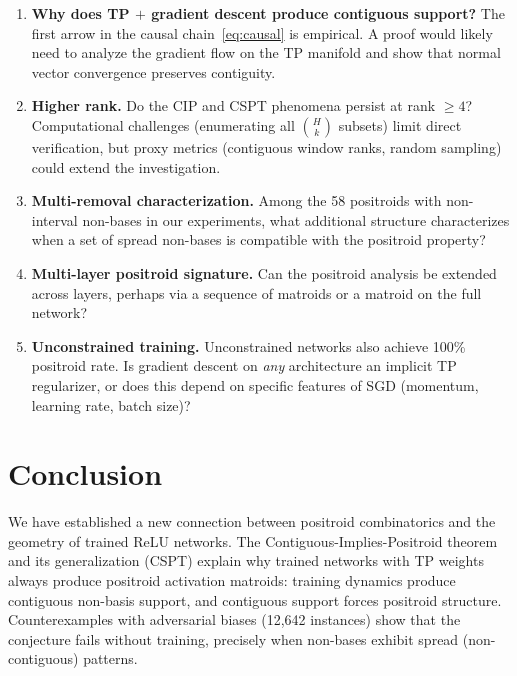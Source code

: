 \documentclass[11pt]{article}
\theoremstyle{definition}
\theoremstyle{remark}
\begin{document}
\begin{enumerate}
  \item \textbf{Why does TP $+$ gradient descent produce contiguous
    support?}  The first arrow in the causal chain~\eqref{eq:causal}
    is empirical.  A proof would likely need to analyze the gradient
    flow on the TP manifold and show that normal vector convergence
    preserves contiguity.

  \item \textbf{Higher rank.}  Do the CIP and CSPT phenomena persist
    at rank $\geq 4$?  Computational challenges (enumerating all
    $\binom{H}{k}$ subsets) limit direct verification, but proxy
    metrics (contiguous window ranks, random sampling) could extend
    the investigation.

  \item \textbf{Multi-removal characterization.}  Among the 58
    positroids with non-interval non-bases in our experiments, what
    additional structure characterizes when a set of spread non-bases
    is compatible with the positroid property?

  \item \textbf{Multi-layer positroid signature.}  Can the positroid
    analysis be extended across layers, perhaps via a sequence of
    matroids or a matroid on the full network?

  \item \textbf{Unconstrained training.}  Unconstrained networks
    also achieve 100\% positroid rate.  Is gradient descent on
    \emph{any} architecture an implicit TP regularizer, or does this
    depend on specific features of SGD (momentum, learning rate,
    batch size)?
\end{enumerate}


\section{Conclusion}\label{sec:conclusion}

We have established a new connection between positroid combinatorics
and the geometry of trained ReLU networks.  The
Contiguous-Implies-Positroid theorem and its generalization (CSPT)
explain why trained networks with TP weights always produce positroid
activation matroids: training dynamics produce contiguous non-basis
support, and contiguous support forces positroid structure.
Counterexamples with adversarial biases (12{,}642 instances) show
that the conjecture fails without training, precisely when non-bases
exhibit spread (non-contiguous) patterns.
\end{document}
